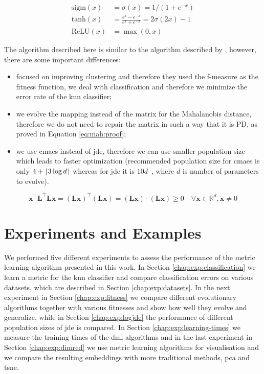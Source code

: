 \documentclass[12pt,a4paper]{report}
\begin{document}
\begin{align}
\text{sigm}(x) &= \sigma(x) = 1/(1+e^{-x}) \label{eq:nn:sigm} \\
\text{tanh}(x) &= \frac{e^x-e^{-x}}{e^x+e^{-x}} = 2\sigma(2x)-1 \label{eq:nn:tanh} \\
\text{ReLU}(x) &= \max(0,x) \label{eq:nn:relu}
\end{align}

The algorithm described here is similar to the algorithm described by \cite{fukui2013evolutionary}, however, there are some important differences:
\begin{itemize}
\item \cite{fukui2013evolutionary} focused on improving clustering and therefore they used the f-measure as the fitness function, we deal with classification and therefore we minimize the error rate of the \ac{knn} classifier;
\item we evolve the mapping instead of the matrix for the Mahalanobis distance, therefore we do not need to repair the matrix in such a way that it is PD, as proved in Equation \ref{eq:mah:proof};
\item we use \ac{cmaes} instead of \ac{jde}, therefore we can use smaller population size which leads to faster optimization (recommended population size for \ac{cmaes} is only $4+\lfloor3\log{d}\rfloor$ \cite{hansen2006cma} whereas for \ac{jde} it is $10d$~\cite{brest2006self}, where $d$ is number of parameters to evolve).
\end{itemize}

\begin{equation}
\bm{x}^\top \bm{L}^\top \bm{L}\bm{x}=(\bm{Lx})^\top(\bm{Lx})=(\bm{Lx})\cdot (\bm{Lx})\geq 0 \quad \forall \bm{x} \in \mathbb{R}^d, \bm{x} \neq 0 \label{eq:mah:proof}
\end{equation}



\chapter{Experiments and Examples} \label{chap:exp}
We performed five different experiments to assess the performance of the metric learning algorithm presented in this work. In Section \ref{chap:exp:classification} we learn a metric for the \ac{knn} classifier and compare classification errors on various datasets, which are described in Section \ref{chap:exp:datasets}. In the next experiment in Section \ref{chap:exp:fitness} we compare different evolutionary algorithms together with various fitnesses and show how well they evolve and generalize, while in Section \ref{chap:exp:logjde} the performance of different population sizes of \ac{jde} is compared. In Section \ref{chap:exp:learning-times} we measure the training times of the \ac{dml} algorithms and in the last experiment in Section \ref{chap:exp:dimred} we use metric learning algorithms for visualisation and we compare the resulting embeddings with more traditional methods, \ac{pca} and \ac{tsne}.
\end{document}
